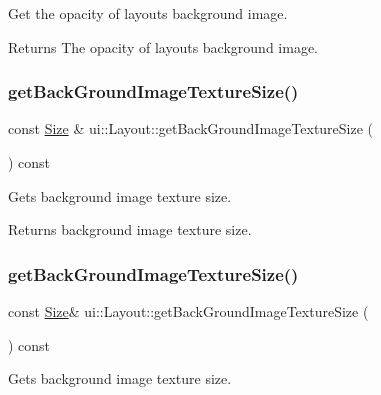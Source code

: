 Get the opacity of layout\textquotesingle{}s background image. \begin{DoxyReturn}{Returns}
The opacity of layout\textquotesingle{}s background image. 
\end{DoxyReturn}
\mbox{\label{classui_1_1Layout_ac5edba295024c73b78a689e008ef8e1e}} 
\subsubsection{\texorpdfstring{get\+Back\+Ground\+Image\+Texture\+Size()}{getBackGroundImageTextureSize()}\hspace{0.1cm}{\footnotesize\ttfamily [1/2]}}
{\footnotesize\ttfamily const \hyperlink{classSize}{Size} \& ui\+::\+Layout\+::get\+Back\+Ground\+Image\+Texture\+Size (\begin{DoxyParamCaption}{ }\end{DoxyParamCaption}) const}

Gets background image texture size.

\begin{DoxyReturn}{Returns}
background image texture size. 
\end{DoxyReturn}
\mbox{\label{classui_1_1Layout_a1c09df045301db369c921da53b6a3f16}} 
\subsubsection{\texorpdfstring{get\+Back\+Ground\+Image\+Texture\+Size()}{getBackGroundImageTextureSize()}\hspace{0.1cm}{\footnotesize\ttfamily [2/2]}}
{\footnotesize\ttfamily const \hyperlink{classSize}{Size}\& ui\+::\+Layout\+::get\+Back\+Ground\+Image\+Texture\+Size (\begin{DoxyParamCaption}{ }\end{DoxyParamCaption}) const}

Gets background image texture size.

